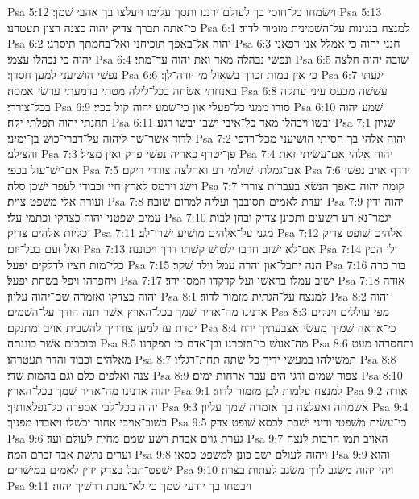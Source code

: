 Psa 5:12  וישׂמחו כל־חוסי בך לעולם ירננו ותסך עלימו ויעלצו בך אהבי שׁמך׃
Psa 5:13  כי־אתה תברך צדיק יהוה כצנה רצון תעטרנו׃
Psa 6:1  למנצח בנגינות על־השׁמינית מזמור לדוד׃
Psa 6:2  יהוה אל־באפך תוכיחני ואל־בחמתך תיסרני׃
Psa 6:3  חנני יהוה כי אמלל אני רפאני יהוה כי נבהלו עצמי׃
Psa 6:4  ונפשׁי נבהלה מאד ואת יהוה עד־מתי׃
Psa 6:5  שׁובה יהוה חלצה נפשׁי הושׁיעני למען חסדך׃
Psa 6:6  כי אין במות זכרך בשׁאול מי יודה־לך׃
Psa 6:7  יגעתי באנחתי אשׂחה בכל־לילה מטתי בדמעתי ערשׂי אמסה׃
Psa 6:8  עשׁשׁה מכעס עיני עתקה בכל־צוררי׃
Psa 6:9  סורו ממני כל־פעלי און כי־שׁמע יהוה קול בכיי׃
Psa 6:10  שׁמע יהוה תחנתי יהוה תפלתי יקח׃
Psa 6:11  יבשׁו ויבהלו מאד כל־איבי ישׁבו יבשׁו רגע׃
Psa 7:1  שׁגיון לדוד אשׁר־שׁר ליהוה על־דברי־כושׁ בן־ימיני׃
Psa 7:2  יהוה אלהי בך חסיתי הושׁיעני מכל־רדפי והצילני׃
Psa 7:3  פן־יטרף כאריה נפשׁי פרק ואין מציל׃
Psa 7:4  יהוה אלהי אם־עשׂיתי זאת אם־ישׁ־עול בכפי׃
Psa 7:5  אם־גמלתי שׁולמי רע ואחלצה צוררי ריקם׃
Psa 7:6  ירדף אויב נפשׁי וישׂג וירמס לארץ חיי וכבודי לעפר ישׁכן סלה׃
Psa 7:7  קומה יהוה באפך הנשׂא בעברות צוררי ועורה אלי משׁפט צוית׃
Psa 7:8  ועדת לאמים תסובבך ועליה למרום שׁובה׃
Psa 7:9  יהוה ידין עמים שׁפטני יהוה כצדקי וכתמי עלי׃
Psa 7:10  יגמר־נא רע רשׁעים ותכונן צדיק ובחן לבות וכליות אלהים צדיק׃
Psa 7:11  מגני על־אלהים מושׁיע ישׁרי־לב׃
Psa 7:12  אלהים שׁופט צדיק ואל זעם בכל־יום׃
Psa 7:13  אם־לא ישׁוב חרבו ילטושׁ קשׁתו דרך ויכוננה׃
Psa 7:14  ולו הכין כלי־מות חציו לדלקים יפעל׃
Psa 7:15  הנה יחבל־און והרה עמל וילד שׁקר׃
Psa 7:16  בור כרה ויחפרהו ויפל בשׁחת יפעל׃
Psa 7:17  ישׁוב עמלו בראשׁו ועל קדקדו חמסו ירד׃
Psa 7:18  אודה יהוה כצדקו ואזמרה שׁם־יהוה עליון׃
Psa 8:1  למנצח על־הגתית מזמור לדוד׃
Psa 8:2  יהוה אדנינו מה־אדיר שׁמך בכל־הארץ אשׁר תנה הודך על־השׁמים׃
Psa 8:3  מפי עוללים וינקים יסדת עז למען צורריך להשׁבית אויב ומתנקם׃
Psa 8:4  כי־אראה שׁמיך מעשׂי אצבעתיך ירח וכוכבים אשׁר כוננתה׃
Psa 8:5  מה־אנושׁ כי־תזכרנו ובן־אדם כי תפקדנו׃
Psa 8:6  ותחסרהו מעט מאלהים וכבוד והדר תעטרהו׃
Psa 8:7  תמשׁילהו במעשׂי ידיך כל שׁתה תחת־רגליו׃
Psa 8:8  צנה ואלפים כלם וגם בהמות שׂדי׃
Psa 8:9  צפור שׁמים ודגי הים עבר ארחות ימים׃
Psa 8:10  יהוה אדנינו מה־אדיר שׁמך בכל־הארץ׃
Psa 9:1  למנצח עלמות לבן מזמור לדוד׃
Psa 9:2  אודה יהוה בכל־לבי אספרה כל־נפלאותיך׃
Psa 9:3  אשׂמחה ואעלצה בך אזמרה שׁמך עליון׃
Psa 9:4  בשׁוב־אויבי אחור יכשׁלו ויאבדו מפניך׃
Psa 9:5  כי־עשׂית משׁפטי ודיני ישׁבת לכסא שׁופט צדק׃
Psa 9:6  גערת גוים אבדת רשׁע שׁמם מחית לעולם ועד׃
Psa 9:7  האויב תמו חרבות לנצח וערים נתשׁת אבד זכרם המה׃
Psa 9:8  ויהוה לעולם ישׁב כונן למשׁפט כסאו׃
Psa 9:9  והוא ישׁפט־תבל בצדק ידין לאמים במישׁרים׃
Psa 9:10  ויהי יהוה משׂגב לדך משׂגב לעתות בצרה׃
Psa 9:11  ויבטחו בך יודעי שׁמך כי לא־עזבת דרשׁיך יהוה׃
